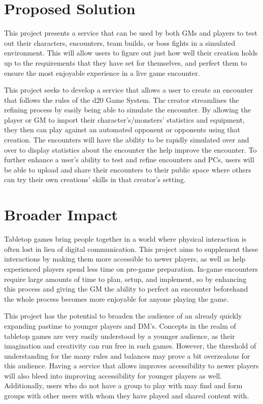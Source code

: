 \documentclass[12pt,a4paper]{report}
\begin{document}
\chapter*{Proposed Solution}

This project presents a service that can be used by both GMs and players to test out their characters, encounters, team builds, or boss fights in a simulated environment. This will allow users to figure out just how well their creation holds up to the requirements that they have set for themselves, and perfect them to ensure the most enjoyable experience in a live game encounter.

This project seeks to develop a service that allows a user to create an encounter that follows the rules of the d20 Game System. The creator streamlines the refining process by easily being able to simulate the encounter. By allowing the player or GM to import their character's/monsters' statistics and equipment, they then can play against an automated opponent or opponents using that creation. The encounters will have the ability to be rapidly simulated over and over to display statistics about the encounter the help improve the encounter. To further enhance a user's ability to test and refine encounters and PCs, users will be able to upload and share their encounters to their public space where others can try their own creations' skills in that creator's setting.

\newpage
\chapter*{Broader Impact}

Tabletop games bring people together in a world where physical interaction is often lost in lieu of digital communication. This project aims to supplement these interactions by making them more accessible to newer players, as well as help experienced players spend less time on pre-game preparation. In-game encounters require large amounts of time to plan, setup, and implement, so by enhancing this process and giving the GM the ability to perfect an encounter beforehand the whole process becomes more enjoyable for anyone playing the game.

This project has the potential to broaden the audience of an already quickly expanding pastime to younger players and DM's. Concepts in the realm of tabletop games are very easily understood by a younger audience, as their imagination and creativity can run free in such games. However, the threshold of understanding for the many rules and balances may prove a bit overzealous for this audience. Having a service that allows improves accessibility to newer players will also bleed into improving accessibility for younger players as well. Additionally, users who do not have a group to play with may find and form groups with other users with whom they have played and shared content with.
	
\end{document}

